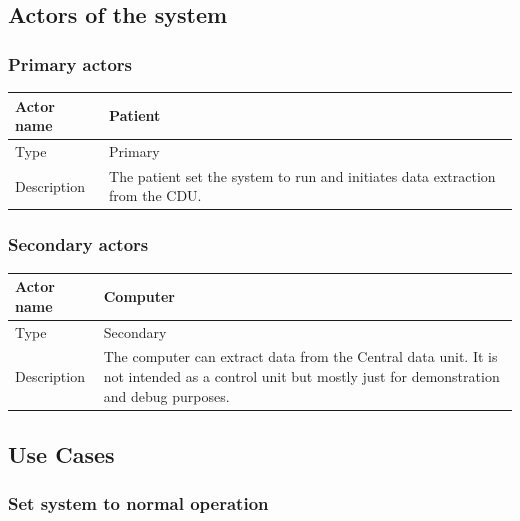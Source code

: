 \subsection{Actors of the system}

\subsubsection{Primary actors}

\begin{table}[H]
	\centering
	\begin{tabular}{|l|p{7cm}|}
	\hline
	Actor name & Patient \\ \hline
	Type & Primary \\ \hline
	Description &  The patient set the system to run and initiates data extraction from the CDU.\\ \hline
	\end{tabular}
\end{table}

\subsubsection{Secondary actors}

\begin{table}[H]
	\centering
	\begin{tabular}{|l|p{7cm}|}
	\hline
	Actor name & Computer \\ \hline
	Type & Secondary \\ \hline
	Description & The computer can extract data from the Central data unit. It is not intended as a control unit but mostly just for demonstration and debug purposes. \\ \hline
	\end{tabular}
\end{table}

\subsection{Use Cases}

\subsubsection{Set system to normal operation}

